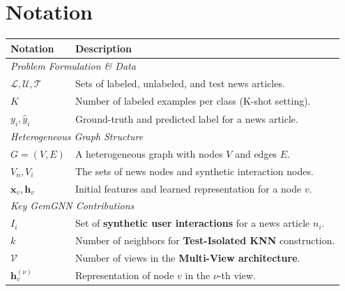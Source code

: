 
\section{Notation}

\begin{table}[h!]
\centering
\begin{tabular}{ll}
\toprule
\textbf{Notation} & \textbf{Description} \\
\midrule

\multicolumn{2}{l}{\emph{Problem Formulation \& Data}} \\
$\mathcal{L}, \mathcal{U}, \mathcal{T}$ & Sets of labeled, unlabeled, and test news articles. \\
$K$ & Number of labeled examples per class (K-shot setting). \\
$y_i, \hat{y}_i$ & Ground-truth and predicted label for a news article. \\

\multicolumn{2}{l}{\emph{Heterogeneous Graph Structure}} \\
$G=(V, E)$ & A heterogeneous graph with nodes $V$ and edges $E$. \\
$V_n, V_i$ & The sets of news nodes and synthetic interaction nodes. \\
$\mathbf{x}_v, \mathbf{h}_v$ & Initial features and learned representation for a node $v$. \\

\multicolumn{2}{l}{\emph{Key GemGNN Contributions}} \\
$I_i$ & Set of \textbf{synthetic user interactions} for a news article $n_i$. \\
$k$ & Number of neighbors for \textbf{Test-Isolated KNN} construction. \\
$\mathcal{V}$ & Number of views in the \textbf{Multi-View architecture}. \\
$\mathbf{h}_v^{(\nu)}$ & Representation of node $v$ in the $\nu$-th view. \\

\bottomrule
\end{tabular}
\end{table}

